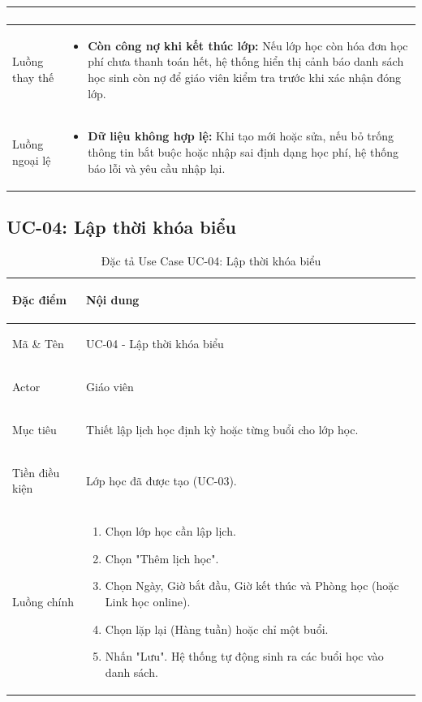 \begin{table}[h!]
\begin{tabularx}{\textwidth}{|>{\bfseries\raggedright\arraybackslash}p{2.5cm}|X|}
\begin{enumerate}
\end{enumerate} \\ \hline
Luồng thay thế & 
\begin{itemize}
    \item \textbf{Còn công nợ khi kết thúc lớp:} Nếu lớp học còn hóa đơn học phí chưa thanh toán hết, hệ thống hiển thị cảnh báo danh sách học sinh còn nợ để giáo viên kiểm tra trước khi xác nhận đóng lớp.
\end{itemize} \\ \hline
Luồng ngoại lệ & 
\begin{itemize}
    \item \textbf{Dữ liệu không hợp lệ:} Khi tạo mới hoặc sửa, nếu bỏ trống thông tin bắt buộc hoặc nhập sai định dạng học phí, hệ thống báo lỗi và yêu cầu nhập lại.
\end{itemize} \\ \hline
\end{tabularx}
\end{table}

\clearpage
\subsection{UC-04: Lập thời khóa biểu}

\begin{table}[htbp]
\centering
\small
\caption{Đặc tả Use Case UC-04: Lập thời khóa biểu}
\label{tab:uc04-lap-thoi-khoa-bieu}
\begin{tabularx}{\textwidth}{|>{\bfseries\raggedright\arraybackslash}p{2.5cm}|X|}
\hline
Đặc điểm & Nội dung \\ \hline
Mã \& Tên & UC-04 - Lập thời khóa biểu \\ \hline
Actor & Giáo viên \\ \hline
Mục tiêu & Thiết lập lịch học định kỳ hoặc từng buổi cho lớp học. \\ \hline
Tiền điều kiện & Lớp học đã được tạo (UC-03). \\ \hline
Luồng chính & 
\begin{enumerate}
    \item Chọn lớp học cần lập lịch.
    \item Chọn "Thêm lịch học".
    \item Chọn Ngày, Giờ bắt đầu, Giờ kết thúc và Phòng học (hoặc Link học online).
    \item Chọn lặp lại (Hàng tuần) hoặc chỉ một buổi.
    \item Nhấn "Lưu". Hệ thống tự động sinh ra các buổi học vào danh sách.
\end{enumerate} \\ \hline
\end{tabularx}
\end{table}
\clearpage
